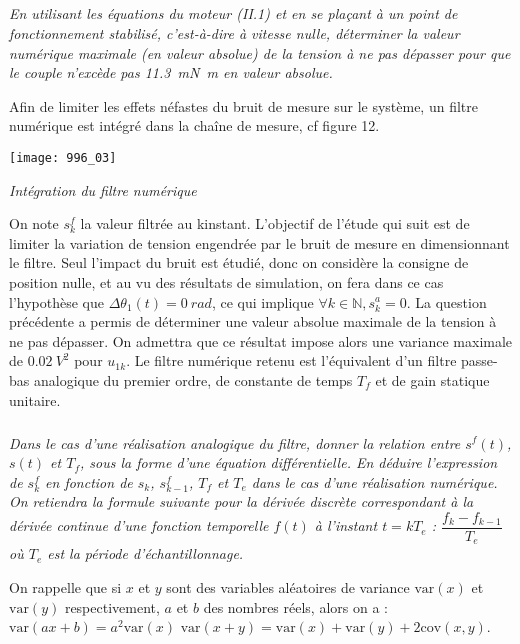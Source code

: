\subparagraph{}
\textit{En utilisant les équations du moteur (II.1) et en se plaçant à un point de fonctionnement stabilisé,
c’est-à-dire à vitesse nulle, déterminer la valeur numérique maximale (en valeur absolue) de la tension à ne pas
dépasser pour que le couple n’excède pas \SI{11,3}{mN.m} en valeur absolue.}
\ifprof
\begin{corrige}
\end{corrige}
\else
\fi

Afin de limiter les effets néfastes du bruit de mesure sur le système, un filtre numérique est intégré dans la
chaîne de mesure, cf figure 12.


\begin{center}

\texttt{[image: 996\_03]} 

\textit{Intégration du filtre numérique}
\end{center}

On note $s_k^f$ la valeur filtrée au k\ieme instant. L’objectif de l’étude qui suit est de limiter la variation de
tension engendrée par le bruit de mesure en dimensionnant le filtre. Seul l’impact du bruit est étudié, donc on
considère la consigne de position nulle, et au vu des résultats de simulation, on fera dans ce cas l’hypothèse que
$\Delta\theta_1(t)=\SI{0}{rad}$, ce qui implique $\forall k \in \mathbb{N}, s_k^a =0$.
La question précédente a permis de déterminer une valeur absolue maximale de la tension à ne pas dépasser. On admettra
que ce résultat impose alors une variance maximale de $\SI{0,02}{V^2}$ pour $u_{1k}$.
Le filtre numérique retenu est l’équivalent d’un filtre passe-bas analogique du premier ordre, de constante de
temps $T_f$ et de gain statique unitaire.

\subparagraph{}
\textit{Dans le cas d’une réalisation analogique du filtre, donner la relation entre $s^f(t)$, $s(t)$ et $T_f$, sous la
forme d’une équation différentielle. En déduire l’expression de $s_k^f$ en fonction de 
$s_k$, $s_{k-1}^f$, $T_f$ et $T_e$ dans le cas d'une réalisation numérique. On retiendra la formule suivante pour la dérivée discrète correspondant à la dérivée continue d’une fonction temporelle $f(t)$ à l’instant $t=kT_e$ : 
$\dfrac{f_k  -f_{k-1}}{T_e}$ où $T_e$ est la période d’échantillonnage.}

\ifprof
\begin{corrige}
\end{corrige}
\else
\fi

On rappelle que si $x$ et $y$ sont des variables aléatoires de variance $\text{var}(x)$ et $\text{var}(y)$ respectivement, $a$ et $b$ des nombres réels, alors on a : $\text{var}\left(ax+b\right) = a^2 \text{var}(x)$ $\text{var}\left(x+y\right) = \text{var}(x)+\text{var}(y)+2\text{cov}(x,y)$. 

